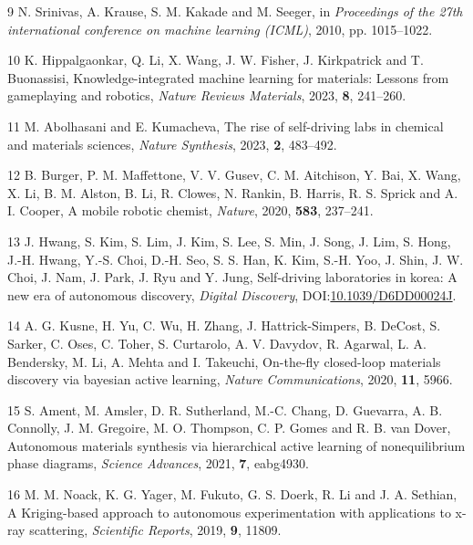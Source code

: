 \documentclass[
]{article}
\newenvironment{cslreferences}%
  {}%
  {\par}
\begin{document}
\begin{cslreferences}
\leavevmode\hypertarget{ref-srinivas2010ucb}{}%
9 N. Srinivas, A. Krause, S. M. Kakade and M. Seeger, in
\emph{Proceedings of the 27th international conference on machine
learning (ICML)}, 2010, pp. 1015--1022.

\leavevmode\hypertarget{ref-hippalgaonkar2023}{}%
10 K. Hippalgaonkar, Q. Li, X. Wang, J. W. Fisher, J. Kirkpatrick and T.
Buonassisi, Knowledge-integrated machine learning for materials: Lessons
from gameplaying and robotics, \emph{Nature Reviews Materials}, 2023,
\textbf{8}, 241--260.

\leavevmode\hypertarget{ref-abolhasani2023}{}%
11 M. Abolhasani and E. Kumacheva, The rise of self-driving labs in
chemical and materials sciences, \emph{Nature Synthesis}, 2023,
\textbf{2}, 483--492.

\leavevmode\hypertarget{ref-burger2020}{}%
12 B. Burger, P. M. Maffettone, V. V. Gusev, C. M. Aitchison, Y. Bai, X.
Wang, X. Li, B. M. Alston, B. Li, R. Clowes, N. Rankin, B. Harris, R. S.
Sprick and A. I. Cooper, A mobile robotic chemist, \emph{Nature}, 2020,
\textbf{583}, 237--241.

\leavevmode\hypertarget{ref-hwang2026korea}{}%
13 J. Hwang, S. Kim, S. Lim, J. Kim, S. Lee, S. Min, J. Song, J. Lim, S.
Hong, J.-H. Hwang, Y.-S. Choi, D.-H. Seo, S. S. Han, K. Kim, S.-H. Yoo,
J. Shin, J. W. Choi, J. Nam, J. Park, J. Ryu and Y. Jung, Self-driving
laboratories in korea: A new era of autonomous discovery, \emph{Digital
Discovery},
DOI:\href{https://doi.org/10.1039/D6DD00024J}{10.1039/D6DD00024J}.

\leavevmode\hypertarget{ref-kusne2020}{}%
14 A. G. Kusne, H. Yu, C. Wu, H. Zhang, J. Hattrick-Simpers, B. DeCost,
S. Sarker, C. Oses, C. Toher, S. Curtarolo, A. V. Davydov, R. Agarwal,
L. A. Bendersky, M. Li, A. Mehta and I. Takeuchi, On-the-fly closed-loop
materials discovery via bayesian active learning, \emph{Nature
Communications}, 2020, \textbf{11}, 5966.

\leavevmode\hypertarget{ref-ament2021}{}%
15 S. Ament, M. Amsler, D. R. Sutherland, M.-C. Chang, D. Guevarra, A.
B. Connolly, J. M. Gregoire, M. O. Thompson, C. P. Gomes and R. B. van
Dover, Autonomous materials synthesis via hierarchical active learning
of nonequilibrium phase diagrams, \emph{Science Advances}, 2021,
\textbf{7}, eabg4930.

\leavevmode\hypertarget{ref-noack2019}{}%
16 M. M. Noack, K. G. Yager, M. Fukuto, G. S. Doerk, R. Li and J. A.
Sethian, A Kriging-based approach to autonomous experimentation with
applications to x-ray scattering, \emph{Scientific Reports}, 2019,
\textbf{9}, 11809.


\end{cslreferences}
\end{document}
